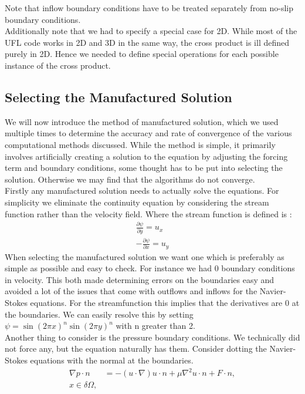 \documentclass[11pt,twoside,a4paper]{article}
\begin{document}
Note that inflow boundary conditions have to be treated separately from no-slip boundary conditions.\\
Additionally note that we had to specify a special case for 2D. While most of the UFL code works in 2D and 3D in the same way, the cross product is ill defined purely in 2D. Hence we needed to define special operations for each possible instance of the cross product.\\

\subsection{Selecting the Manufactured Solution}
We will now introduce the method of manufactured solution, which we used multiple times to determine the accuracy and rate of convergence of the various computational methods discussed. While the method is simple, it primarily involves artificially creating a solution to the equation by adjusting the forcing term and boundary conditions, some thought has to be put into selecting the solution. Otherwise we may find that the algorithms do not converge.\\
Firstly any manufactured solution needs to actually solve the equations. For simplicity we eliminate the continuity equation by considering the stream function rather than the velocity field. Where the stream function is defined is :
\begin{align*}
\frac{ \partial \psi}{\partial y} = u_x \\
-\frac{\partial \psi}{\partial x} = u_y
\end{align*}
When selecting the manufactured solution we want one which is preferably as simple as possible and easy to check. For instance we had $0$ boundary conditions in velocity. This both made determining errors on the boundaries easy and avoided a lot of the issues that come with outflows and inflows for the Navier-Stokes equations. For the streamfunction this implies that the derivatives are 0 at the boundaries. We can easily resolve this by setting $\psi = \sin(2 \pi x)^n \sin(2 \pi y)^n$ with n greater than 2.\\
Another thing to consider is the pressure boundary conditions. We technically did not force any, but the equation naturally has them. Consider dotting the Navier-Stokes equations with the normal at the boundaries.
\begin{align*}
\nabla p \cdot n &= -(u \cdot \nabla) u \cdot n  + \mu \nabla^2 u \cdot n + F \cdot n, \\
x \in \delta \Omega,
\end{align*}
\end{document}
